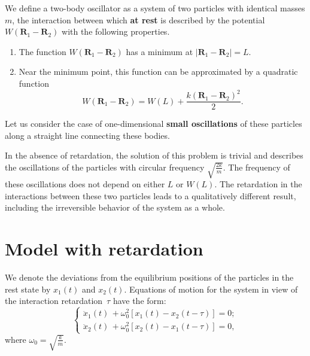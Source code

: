 \documentclass[a4,%
amsmath,amssymb,
12pt
]{revtex4-1}
\begin{document}
We define a two-body oscillator as a system of two particles with identical masses $ m $, the interaction between which \textbf {at rest} is described by the potential $ W \left (\mathbf {R} _1 - \mathbf {R} _2 \right) $ with the following properties.
%
\begin{enumerate}
	\item The function $W\left(\mathbf{R}_1 - \mathbf{R}_2 \right)$ has a minimum at  $\left|\mathbf{R}_1 - \mathbf{R}_2 \right| = L$.
	\item Near the minimum point, this function can be approximated by a quadratic function
	\begin{equation}\label{kx2}
	W\left(\mathbf{R}_1 - \mathbf{R}_2 \right) = W\left(L \right) + \frac{k\left( \mathbf{R}_1 - \mathbf{R}_2 \right) ^2}{2}.
	\end{equation}
\end{enumerate}
Let us consider the case of one-dimensional \textbf{small oscillations} of these particles along a straight line connecting these bodies.

In the absence of retardation, the solution of this problem is trivial and describes the oscillations of the particles with circular frequency $\displaystyle \sqrt{\frac{2k}{m}} $.
The frequency of these oscillations does not depend on either $L$ or $W\left(L \right) $. The retardation in the interactions between these two particles leads to a qualitatively different result, including the irreversible behavior of the system as a whole.

\section{Model with retardation}

We denote the deviations from the equilibrium positions of the particles in the rest state by $x_1\left( t\right) $ and $x_2\left( t\right) $. 
Equations of motion for the system in view of the interaction retardation~$\tau$  have the form: 
\begin{equation}\label{Eq-2}
\left\lbrace 
\begin{array}{l}
{\displaystyle \ddot{x}_1(t)\, + \omega_0^2 \left[x_1(t) - x_2(t-\tau) \right] = 0; } \\
{\displaystyle \ddot{x}_2(t)\, + \omega_0^2 \left[x_2(t) - x_1(t-\tau) \right] = 0,}
\end{array}
\right.
\end{equation}
where $\omega_0 = \sqrt{\frac{k}{m}}$. 
\end{document}
